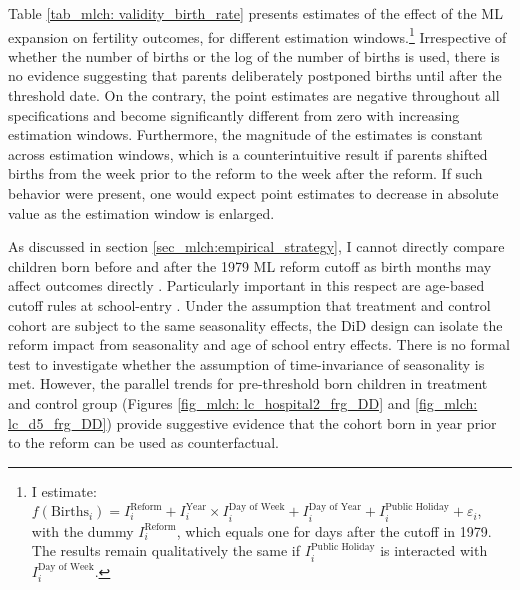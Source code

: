 Table \ref{tab_mlch: validity_birth_rate} presents estimates of the effect of the ML expansion on fertility outcomes, for different estimation windows.\footnote{I estimate: $f(\text{Births}_i) = I^{\text{Reform}}_i + I^{\text{Year}}_i\times I^{\text{Day of Week}}_i + I^{\text{Day of Year}}_i + I^{\text{Public Holiday}}_i + \varepsilon_i$, with the dummy $I^{\text{Reform}}_i$, which equals one for days after the cutoff in 1979. The results remain qualitatively the same if $I^{\text{Public Holiday}}_i$ is interacted with $I^{\text{Day of Week}}_i$.} Irrespective of whether the number of births or the log of the number of births is used, there is no evidence suggesting that parents deliberately postponed births until after the threshold date. On the contrary, the point estimates are negative throughout all specifications and become significantly different from zero with increasing estimation windows. Furthermore, the magnitude of the estimates is constant across estimation windows, which is a counterintuitive result if parents shifted births from the week prior to the reform to the week after the reform. If such behavior were present, one would expect point estimates to decrease in absolute value as the estimation window is enlarged. 





As discussed in section \ref{sec_mlch:empirical_strategy}, I cannot directly compare children born before and after the 1979 ML reform cutoff as birth months may affect outcomes directly \citep{buckles2013season,currie2013within}. Particularly important in this respect are age-based cutoff rules at school-entry \citep{black2011too}. Under the assumption that treatment and control cohort are subject to the same seasonality effects, the DiD design can isolate the reform impact from seasonality and age of school entry effects. There is no formal test to investigate whether the assumption of time-invariance of seasonality is met. However, the parallel trends for pre-threshold born children in treatment and control group (Figures \ref{fig_mlch: lc_hospital2_frg_DD} and \ref{fig_mlch: lc_d5_frg_DD}) provide suggestive evidence that the cohort born in year prior to the reform can be used as counterfactual.


